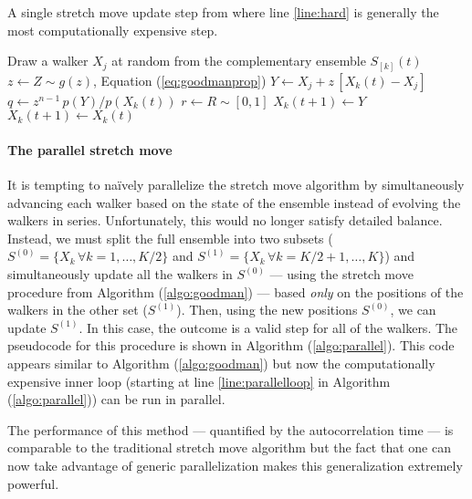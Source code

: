 \documentclass[12pt,preprint]{aastex}
\newcommand{\Eq}[1]{Equation (\ref{eq:#1})}
\newcommand{\eq}[1]{Equation (\ref{eq:#1})}
\newcommand{\algo}[1]{Algorithm (\ref{algo:#1})}
\newcommand{\algolabel}[1]{\label{algo:#1}}
\newcommand{\ensemble}{S}
\newcommand{\colorens}[1]{\ensemble^{(#1)}}
\newcommand{\red}{\colorens{0}}
\newcommand{\blue}{\colorens{1}}
\renewcommand{\vector}[1]{#1}
\begin{document}
\begin{algorithm}
\caption{A single stretch move update step from  where
    line \ref{line:hard} is generally the most computationally expensive
    step. \algolabel{goodman}}
\begin{algorithmic}[1]
    \STATE Draw a walker $X_j$ at random from the complementary ensemble %
        $\ensemble_{[k]}(t)$
    \STATE $z \gets Z \sim g(z)$, \Eq{goodmanprop}
    \STATE $\vector{Y} \gets \vector{X_j} %
                + z \, [ \vector{X_k} (t) - \vector{X_j}]$
    \STATE $q \gets z^{n-1} \, p(Y)/p(X_k(t))$ \label{line:hard}
    \STATE $r \gets R \sim [0, 1]$
    \IF{$R \ge q$, \eq{acceptance}}
        \STATE $X_k(t+1) \gets Y$
    \ELSE
        \STATE $X_k(t+1) \gets X_k(t)$
    \ENDIF
\ENDFOR
\end{algorithmic}
\end{algorithm}

\paragraph{The parallel stretch move}

It is tempting to na\"ively parallelize the stretch move algorithm by
simultaneously advancing each walker based on the state of the ensemble
instead of evolving the walkers in series. Unfortunately, this would no
longer satisfy detailed balance. Instead, we must split the full ensemble
into two subsets
($\red = \{ \vector{X_k} \, \forall k = 1, \ldots, K/2 \}$ and
$\blue = \{ \vector{X_k} \, \forall k = K/2+1, \ldots, K \}$) and
simultaneously update all the walkers in $\red$
--- using the stretch move procedure from \algo{goodman} ---
based \emph{only} on the positions of the walkers in the other set
($\blue$). Then, using the new positions $\red$,
we can update $\blue$. In this case, the outcome is a valid step
for all of the walkers. The pseudocode for
this procedure is shown in \algo{parallel}. This code appears similar to
\algo{goodman} but now the computationally expensive inner loop
(starting at line \ref{line:parallelloop} in \algo{parallel}) can be run in
parallel.

The performance of this method --- quantified by the autocorrelation time ---
is comparable to the traditional stretch move algorithm but the fact that one
can now take advantage of generic parallelization makes this generalization
extremely powerful.
\end{document}
